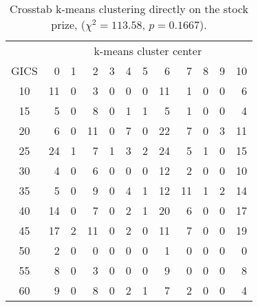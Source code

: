 
\begin{table}
	\centering
	\caption{Crosstab k-means clustering directly on the stock prize, ($\chi^2 = 113.58$, $p = 0.1667$).}
	\label{tbl:k-means-euc-direct}
	\begin{tabular}{c rrrrrrrrrrr} \toprule
		 & \multicolumn{11}{c}{k-means cluster center}     \\ \cmidrule{2-12}
		GICS & 0 & 1  & 2 & 3  & 4  & 5 & 6  & 7 & 8 & 9  & 10 \\ \midrule
		10 & 11 & 0 & 3  & 0 & 0 & 0 & 11 & 1  & 0 & 0 & 6  \\
		15 & 5  & 0 & 8  & 0 & 1 & 1 & 5  & 1  & 0 & 0 & 4  \\
		20 & 6  & 0 & 11 & 0 & 7 & 0 & 22 & 7  & 0 & 3 & 11 \\
		25 & 24 & 1 & 7  & 1 & 3 & 2 & 24 & 5  & 1 & 0 & 15 \\
		30 & 4  & 0 & 6  & 0 & 0 & 0 & 12 & 2  & 0 & 0 & 10 \\
		35 & 5  & 0 & 9  & 0 & 4 & 1 & 12 & 11 & 1 & 2 & 14 \\
		40 & 14 & 0 & 7  & 0 & 2 & 1 & 20 & 6  & 0 & 0 & 17 \\
		45 & 17 & 2 & 11 & 0 & 2 & 0 & 11 & 7  & 0 & 0 & 19 \\
		50 & 2  & 0 & 0  & 0 & 0 & 0 & 1  & 0  & 0 & 0 & 0  \\
		55 & 8  & 0 & 3  & 0 & 0 & 0 & 9  & 0  & 0 & 0 & 8  \\
		60 & 9  & 0 & 8  & 0 & 2 & 1 & 7  & 2  & 0 & 0 & 4 \\ \bottomrule
	\end{tabular}
\end{table}